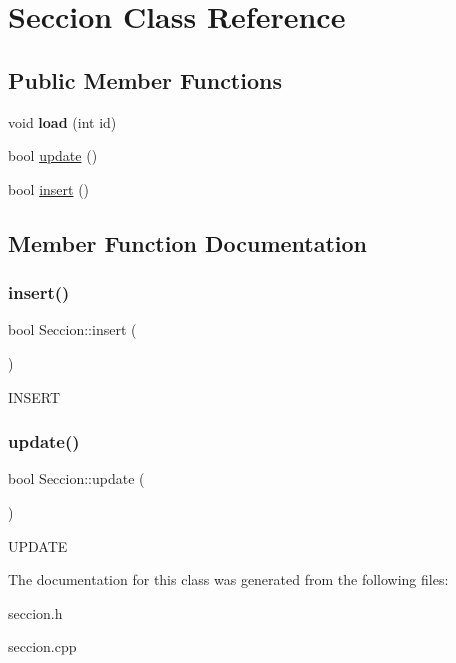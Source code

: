 \hypertarget{classSeccion}{}\section{Seccion Class Reference}
\label{classSeccion}
\subsection*{Public Member Functions}
\begin{DoxyCompactItemize}
\item 
\mbox{\label{classSeccion_ad08582ac23fc2f1f12d456dff5dbf5e8}} 
void {\bfseries load} (int id)
\item 
bool \mbox{\hyperlink{classSeccion_a95c81e8c7a019fa4773d41e5dc7d2b83}{update}} ()
\item 
bool \mbox{\hyperlink{classSeccion_a92ada4695cb5f8ec96dcdccac56dd888}{insert}} ()
\end{DoxyCompactItemize}


\subsection{Member Function Documentation}
\mbox{\label{classSeccion_a92ada4695cb5f8ec96dcdccac56dd888}} 
\subsubsection{\texorpdfstring{insert()}{insert()}}
{\footnotesize\ttfamily bool Seccion\+::insert (\begin{DoxyParamCaption}{ }\end{DoxyParamCaption})}

I\+N\+S\+E\+RT \mbox{\label{classSeccion_a95c81e8c7a019fa4773d41e5dc7d2b83}} 
\subsubsection{\texorpdfstring{update()}{update()}}
{\footnotesize\ttfamily bool Seccion\+::update (\begin{DoxyParamCaption}{ }\end{DoxyParamCaption})}

U\+P\+D\+A\+TE 

The documentation for this class was generated from the following files\+:\begin{DoxyCompactItemize}
\item 
seccion.\+h\item 
seccion.\+cpp\end{DoxyCompactItemize}
